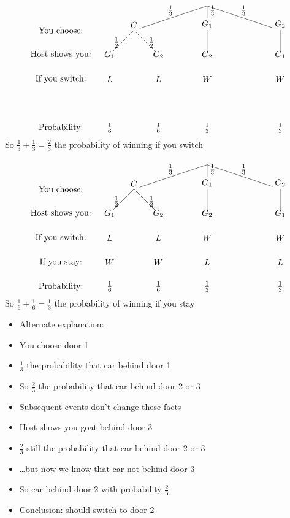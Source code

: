 \documentclass[handout]{beamer}
\theoremstyle{definition}
\begin{document}
\begin{frame}
\[\begin{xy}<1cm,0cm>:
(-6,-1)*{\text{You choose:}};
(-6,-2)*{\text{Host shows you:}};
(-6,-3)*{\text{If you switch:}};
(-6,-5)*{\text{Probability:}};
(0,0)="0";
(-3,-1)="-31";
(0,-1)="01";
(3,-1)="31";
"0";"-31"*+!D{C}**\dir{-}?*+!D{\frac{1}{3}};
"0";"01"*+!D{G_1}**\dir{-}?*+!DL{\frac{1}{3}};
"0";"31"*+!D{G_2}**\dir{-}?*+!D{\frac{1}{3}};
"-31";(-4,-2)*{G_1}**\dir{-}?*+!R{\frac{1}{2}};
"-31";(-2,-2)*{G_2}**\dir{-}?*+!L{\frac{1}{2}};
"01";(0,-2)*{G_2}**\dir{-};
"31";(3,-2)*{G_1}**\dir{-};
(-4,-3)*{L};(-2,-3)*{L};(0,-3)*{W};(3,-3)*{W};
(-4,-5)*{\frac{1}{6}};(-2,-5)*{\frac{1}{6}};
(0,-5)*{\frac{1}{3}};(3,-5)*{\frac{1}{3}};
\end{xy}\]
So $\frac{1}{3}+\frac{1}{3}=\frac{2}{3}$ the
probability of winning if you switch
\end{frame}

\begin{frame}
\[\begin{xy}<1cm,0cm>:
(-6,-1)*{\text{You choose:}};
(-6,-2)*{\text{Host shows you:}};
(-6,-3)*{\text{If you switch:}};
(-6,-4)*{\text{If you stay:}};
(-6,-5)*{\text{Probability:}};
(0,0)="0";
(-3,-1)="-31";
(0,-1)="01";
(3,-1)="31";
"0";"-31"*+!D{C}**\dir{-}?*+!D{\frac{1}{3}};
"0";"01"*+!D{G_1}**\dir{-}?*+!DL{\frac{1}{3}};
"0";"31"*+!D{G_2}**\dir{-}?*+!D{\frac{1}{3}};
"-31";(-4,-2)*{G_1}**\dir{-}?*+!R{\frac{1}{2}};
"-31";(-2,-2)*{G_2}**\dir{-}?*+!L{\frac{1}{2}};
"01";(0,-2)*{G_2}**\dir{-};
"31";(3,-2)*{G_1}**\dir{-};
(-4,-3)*{L};(-2,-3)*{L};(0,-3)*{W};(3,-3)*{W};
(-4,-4)*{W};(-2,-4)*{W};(0,-4)*{L};(3,-4)*{L};
(-4,-5)*{\frac{1}{6}};(-2,-5)*{\frac{1}{6}};
(0,-5)*{\frac{1}{3}};(3,-5)*{\frac{1}{3}};
\end{xy}\]
So $\frac{1}{6}+\frac{1}{6}=\frac{1}{3}$ the
probability of winning if you stay
\end{frame}

\begin{frame}
\begin{itemize}
\item Alternate explanation:
\item You choose door 1
\item $\frac{1}{3}$ the probability that car behind door 1
\item So $\frac{2}{3}$ the probability that car behind
door 2 or 3
\item Subsequent events don't change these facts
\item Host shows you goat behind door 3
\item $\frac{2}{3}$ still the probability that car behind
door 2 or 3
\item \dots but now we know that car \alert{not} behind
door 3
\item So car behind door 2 with probability $\frac{2}{3}$
\item Conclusion: should switch to door 2
\end{itemize}
\end{frame}
\end{document}
